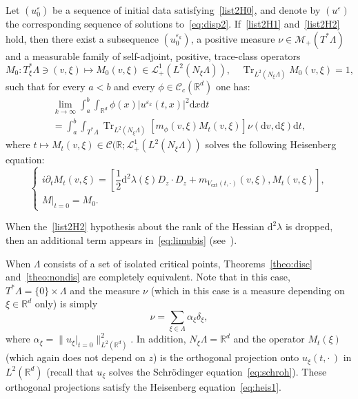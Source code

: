 \documentclass[AHL,Unicode,longabstracts]{cedram}
\DeclareMathOperator{\ext}{ext}
\DeclareMathOperator{\Trr}{Tr}
\newcommand*\R{{\mathbb R}}
\newcommand*\eps{\varepsilon}
\newcommand*\Tr{\Trr}
\numberwithin{equation}{section}
\newcommand*{\dd}{\mathrm{d}}
\newcommand*{\dt}{\dd t}
\newcommand*{\dx}{\dd x}
\newcommand*{\dv}{\dd v}
\newcommand*{\dxi}{\dd \xi}
\begin{document}
\begin{theo}\label{theo:nondis}
Let $(u^\eps_0)$ be a sequence of initial data satisfying~\eqref{list2H0}, and denote by $(u^\eps)$ the corresponding sequence of solutions to~\eqref{eq:disp2}. If~\eqref{list2H1} and~\eqref{list2H2} hold, then there exist a subsequence $(u^{\eps_k}_0)$, a positive measure $\nu\in\mathcal{M}_+(T^*\Lambda)$ and a measurable family of self-adjoint, positive, trace-class operators
\[
M_0:T^*_\xi\Lambda \ni (v,\xi)\longmapsto M_0(v,\xi)\in \mathcal{L}_+^1\left(L^2(N_\xi\Lambda)\right),\quad \Tr_{L^2(N_\xi\Lambda)} M_0(v,\xi)=1,
\]
such that for every $a<b$ and every $\phi\in \mathcal{C}_c(\R^d)$ one has:
\begin{multline}\label{eq:limubis}
\lim_{k\to\infty}\int_a^b\int_{\R^d}\phi(x)|u^{\eps_k}(t,x)|^2\dx\dt\\
=\int_a^b \int_{T^*\Lambda}\Tr_{L^2(N_\xi\Lambda)}\left[m_\phi(v,\xi)M_t(v,\xi)\right]\nu(\dv,\dxi)\dt,
\end{multline}
where $t\mapsto M_t(v,\xi)\in \mathcal{C}(\R;\mathcal{L}_+^1(L^2(N_\xi\Lambda))$ solves the following Heisenberg equation:
\begin{equation}\label{eq:heis1}
\begin{cases}
i\partial_t M_t(v,\xi) =\left[\dfrac{1}{2} \dd^2\lambda(\xi)D_z\cdot D_z + m_{V_{\ext}(t,\cdot)}(v,\xi), M_t(v,\xi)\right],\\
M |_{t=0}=M_0.
\end{cases}
\end{equation}
\end{theo}


\begin{rema}
When the~\eqref{list2H2} hypothesis about the rank of the Hessian $\dd^2\lambda$ is dropped, then an additional term appears in~\eqref{eq:limubis} (see~\cite{CFMProc}).
\end{rema}

When $\Lambda$ consists of a set of isolated critical points, Theorems~\ref{theo:disc} and~\ref{theo:nondis} are completely equivalent. Note that in this case, $T^*\Lambda=\{0\}\times\Lambda$ and the measure $\nu$ (which in this case is a measure depending on $\xi\in\R^d$ only) is simply
\[
\nu=\sum_{\xi\in\Lambda}\alpha_\xi\delta_\xi,
\]
where $\alpha_\xi = \|u_\xi|_{t=0}\|^2_{L^2(\R^d)}$. In addition, $N_\xi\Lambda=\R^d$ and the operator $M_t(\xi)$ (which again does not depend on $z$) is the orthogonal projection onto $u_\xi(t,\cdot\,)$ in $L^2(\R^d)$ (recall that $u_\xi$ solves the Schr\"odinger equation~\eqref{eq:schroh}). These orthogonal projections satisfy the Heisenberg equation~\eqref{eq:heis1}.
\end{document}
